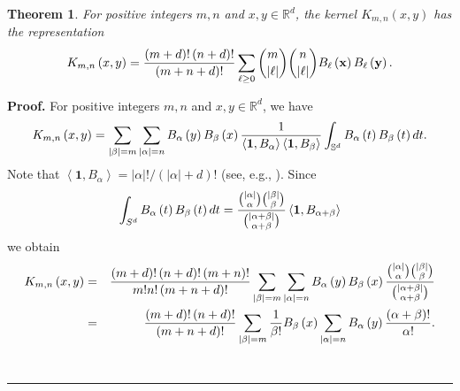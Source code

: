 \documentclass[12pt,reqno]{article}
\newtheorem{theorem}{Theorem}
\newenvironment{proof}[1][Proof]{\noindent\textbf{#1.} }{\ \rule{0.5em}{0.5em}}
\begin{document}
\begin{theorem}
For positive integers $m,n$ and $x,y\in \mathbb{R}^{d}$, the kernel $%
K_{m,n}\left( x,y\right) $ has the representation 
\begin{equation*}
K_{m,n}\left( x,y\right) =\frac{\left( m+d\right) !\left( n+d\right) !}{%
\left( m+n+d\right) !}\sum_{\ell \geq 0}\binom{m}{\left \vert \ell \right
\vert }\binom{n}{\left \vert \ell \right \vert }B_{\ell }\left( \mathbf{x}%
\right) B_{\ell }\left( \mathbf{y}\right) .
\end{equation*}
\end{theorem}

\begin{proof}
For positive integers $m,n$ and $x,y\in \mathbb{R}^{d}$, we have 
\begin{equation*}
K_{m,n}\left( x,y\right) =\sum_{\left\vert \beta \right\vert
=m}\sum_{\left\vert \alpha \right\vert =n}B_{\alpha }\left( y\right)
B_{\beta }\left( x\right) \frac{1}{\left\langle \mathbf{1},B_{\alpha
}\right\rangle \left\langle \mathbf{1},B_{\beta }\right\rangle }\int_{%
\mathbb{S}^{d}}B_{\alpha }\left( t\right) B_{\beta }\left( t\right) dt.
\end{equation*}%
Note that $\left\langle \mathbf{1},B_{\alpha }\right\rangle =\left\vert
\alpha \right\vert !/\left( \left\vert \alpha \right\vert +d\right) !$ (see,
e.g., \cite[Page~147]{Berens-Schmidt-Xu-JAT-1992}). Since 
\begin{equation*}
\int_{S^{d}}B_{\alpha }\left( t\right) B_{\beta }\left( t\right) dt=\frac{%
\binom{\left\vert \alpha \right\vert }{\alpha }\binom{\left\vert \beta
\right\vert }{\beta }}{\binom{\left\vert \alpha +\beta \right\vert }{\alpha
+\beta }}\left\langle \mathbf{1},B_{\alpha +\beta }\right\rangle 
\end{equation*}%
we obtain 
\begin{eqnarray*}
K_{m,n}\left( x,y\right)  &=&\frac{\left( m+d\right) !\left( n+d\right)
!\left( m+n\right) !}{m!n!\left( m+n+d\right) !}\sum_{\left\vert \beta
\right\vert =m}\sum_{\left\vert \alpha \right\vert =n}B_{\alpha }\left(
y\right) B_{\beta }\left( x\right) \frac{\binom{\left\vert \alpha
\right\vert }{\alpha }\binom{\left\vert \beta \right\vert }{\beta }}{\binom{%
\left\vert \alpha +\beta \right\vert }{\alpha +\beta }} \\
&=&\frac{\left( m+d\right) !\left( n+d\right) !}{\left( m+n+d\right) !}%
\sum_{\left\vert \beta \right\vert =m}\frac{1}{\beta !}B_{\beta }\left(
x\right) \sum_{\left\vert \alpha \right\vert =n}B_{\alpha }\left( y\right) 
\frac{\left( \alpha +\beta \right) !}{\alpha !}.

\end{eqnarray*}
\end{proof}
\end{document}

